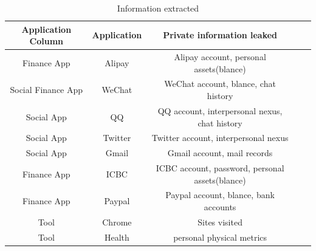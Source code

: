 \begin{table}[t]
	\centering
	\begin{tabular}{|c|c|c|c|c|}
		\hline
		Application Column  & Application & Private information leaked                       \\
		\hline
		Finance App         & Alipay      & Alipay account, personal assets(blance)          \\
		\hline
		Social  Finance App & WeChat      & WeChat account, blance, chat history             \\
		\hline
		Social App          & QQ          & QQ account, interpersonal nexus, chat history    \\
		\hline
		Social App          & Twitter     & Twitter account, interpersonal nexus             \\
		\hline
		Social App          & Gmail       & Gmail account, mail records                      \\
		\hline
		Finance App         & ICBC        & ICBC account, password, personal assets(blance)  \\
		\hline
		Finance App         & Paypal      & Paypal account, blance, bank accounts            \\
		\hline
		Tool                & Chrome      & Sites visited                                    \\
		\hline
		Tool                & Health      & personal physical metrics      					 \\
		\hline
	\end{tabular}
	\linebreak
	\caption{Information extracted}
	\label{table:information_extracted}
\end{table}
